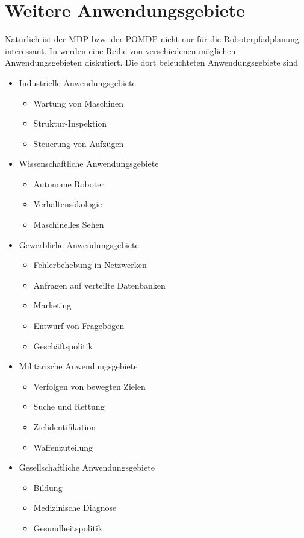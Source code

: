 \documentclass[a4paper]{IEEEtran}
\begin{document}
\section{Weitere Anwendungsgebiete}
\label{sec:furtherApplications}
Natürlich ist der MDP bzw. der POMDP nicht nur für die Roboterpfadplanung interessant. In \cite{cassandra1998survey} werden eine Reihe von verschiedenen möglichen Anwendungsgebieten diskutiert. Die dort beleuchteten Anwendungsgebiete sind
\begin{itemize}
	\item Industrielle Anwendungsgebiete
	\begin{itemize}
		\item Wartung von Maschinen
		\item Struktur-Inspektion
		\item Steuerung von Aufzügen
	\end{itemize}
	\item Wissenschaftliche Anwendungsgebiete
	\begin{itemize}
		\item Autonome Roboter
		\item Verhaltensökologie
		\item Maschinelles Sehen
	\end{itemize}
	\item Gewerbliche Anwendungsgebiete
	\begin{itemize}
		\item Fehlerbehebung in Netzwerken
		\item Anfragen auf verteilte Datenbanken
		\item Marketing
		\item Entwurf von Fragebögen
		\item Geschäftspolitik
	\end{itemize}
	\item Militärische Anwendungsgebiete
	\begin{itemize}
		\item Verfolgen von bewegten Zielen
		\item Suche und Rettung
		\item Zielidentifikation
		\item Waffenzuteilung
	\end{itemize}
	\item Gesellschaftliche Anwendungsgebiete
	\begin{itemize}
		\item Bildung
		\item Medizinische Diagnose
		\item Gesundheitspolitik
	\end{itemize}
\end{itemize}



\end{document}
